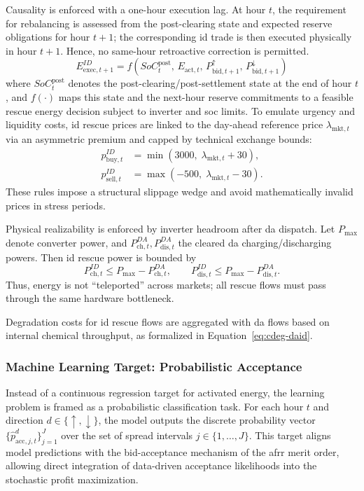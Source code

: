 Causality is enforced with a one-hour execution lag. At hour $t$, the requirement for rebalancing is assessed from the post-clearing state and expected reserve obligations for hour $t+1$; the corresponding \gls{id} trade is then executed physically in hour $t+1$. Hence, no same-hour retroactive correction is permitted.
\begin{equation}\label{eq:id-one-hour-lag}
    E^{ID}_{\mathrm{exec},t+1} = f\left(SoC_t^{\mathrm{post}},\,E_{\text{act},t},\,P_{\text{bid},t+1}^{\uparrow},\,P_{\text{bid},t+1}^{\downarrow}\right)
\end{equation}
where $SoC_t^{\mathrm{post}}$ denotes the post-clearing/post-settlement state at the end of hour $t$, and $f(\cdot)$ maps this state and the next-hour reserve commitments to a feasible rescue energy decision subject to inverter and \gls{soc} limits. To emulate urgency and liquidity costs, \gls{id} rescue prices are linked to the day-ahead reference price $\lambda_{\text{mkt},t}$ via an asymmetric premium and capped by technical exchange bounds:
\begin{align}
    p^{ID}_{\mathrm{buy},t}  & = \min\!\left(3000,\; \lambda_{\text{mkt},t}+30\right), \\
    p^{ID}_{\mathrm{sell},t} & = \max\!\left(-500,\; \lambda_{\text{mkt},t}-30\right).
\end{align}
These rules impose a structural slippage wedge and avoid mathematically invalid prices in stress periods.

Physical realizability is enforced by inverter headroom after \gls{da} dispatch. Let $P_{\text{max}}$ denote converter power, and $P^{DA}_{\mathrm{ch},t},P^{DA}_{\mathrm{dis},t}$ the cleared \gls{da} charging/discharging powers. Then \gls{id} rescue power is bounded by
\begin{equation}
    P^{ID}_{\mathrm{ch},t} \le P_{\text{max}}-P^{DA}_{\mathrm{ch},t}, \qquad
    P^{ID}_{\mathrm{dis},t} \le P_{\text{max}}-P^{DA}_{\mathrm{dis},t}.
\end{equation}
Thus, energy is not ``teleported'' across markets; all rescue flows must pass through the same hardware bottleneck.

Degradation costs for \gls{id} rescue flows are aggregated with \gls{da} flows based on internal chemical throughput, as formalized in Equation~\ref{eq:cdeg-daid}.


\subsubsection{Machine Learning Target: Probabilistic Acceptance}
Instead of a continuous regression target for activated energy, the learning problem is framed as a probabilistic classification task. For each hour $t$ and direction $d\in\{\uparrow,\downarrow\}$, the model outputs the discrete probability vector $\big\{\hat{p}_{\text{acc}, j, t}^{d}\big\}_{j=1}^{J}$ over the set of spread intervals $j\in\{1,\dots,J\}$. This target aligns model predictions with the bid-acceptance mechanism of the \gls{afrr} merit order, allowing direct integration of data-driven acceptance likelihoods into the stochastic profit maximization.

